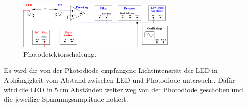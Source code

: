 \begin{figure}[H]
    \centering
    \includegraphics[width=0.7\textwidth]{build/Abb_5.pdf}
    \caption {Photodetektorschaltung.\cite{V303}}
    \label{fig:Abb_5}
\end{figure}
Es wird die von der Photodiode empfangene Lichtintensität der LED in Abhängigkeit vom Abstand zwischen LED und Photodiode untersucht.
Dafür wird die LED in $\qty{5}{\centi\meter}$ Abständen weiter weg von der Photodiode geschoben und die jeweilige Spanunngsamplitude notiert.

